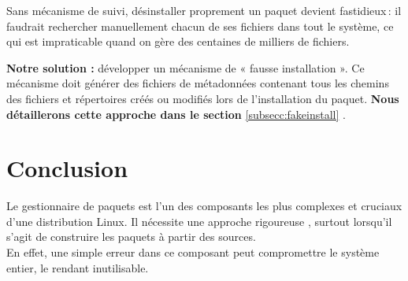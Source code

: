 Sans mécanisme de suivi, désinstaller proprement un paquet devient fastidieux : il faudrait rechercher manuellement chacun de ses fichiers dans tout le système, ce qui est impraticable quand on gère des centaines de milliers de fichiers.

\textbf{Notre solution :} développer un mécanisme de « fausse installation ». Ce mécanisme doit générer des fichiers de métadonnées contenant tous les chemins des fichiers et répertoires créés ou modifiés lors de l’installation du paquet. \textbf{Nous détaillerons cette approche dans le section} \textcolor{blue}{\ref{subsecc:fakeinstall}} .
\section{Conclusion}
Le gestionnaire de paquets est l'un des composants les plus complexes et cruciaux d'une distribution Linux. Il nécessite une approche rigoureuse , surtout lorsqu'il s'agit de construire les paquets à partir des sources. \\
En effet, une simple erreur dans ce composant peut compromettre le système entier, le rendant inutilisable.



\clearpage